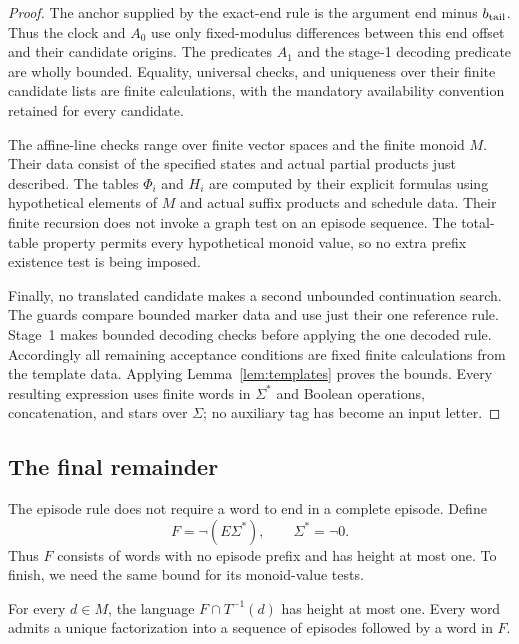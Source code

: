 \begin{proof}
The anchor supplied by the exact-end rule is the argument end minus
$b_{\rm tail}$.  Thus the clock and $A_0$ use only fixed-modulus
differences between this end offset and their candidate origins.
The predicates $A_1$ and the stage-1 decoding predicate are wholly
bounded.  Equality, universal checks, and uniqueness over their finite
candidate lists are finite calculations, with the mandatory availability
convention retained for every candidate.

The affine-line checks range over finite vector spaces and the finite
monoid $M$.  Their data consist of the specified states and actual
partial products just described.  The tables $\Phi_i$ and $H_i$ are
computed by their explicit formulas using hypothetical elements of $M$
and actual suffix products and schedule data.  Their finite recursion
does not invoke a graph test on an episode sequence.  The total-table
property permits every hypothetical monoid value, so no extra prefix
existence test is being imposed.

Finally, no translated candidate makes a second unbounded continuation
search.  The guards compare bounded marker data and use just their one
reference rule.  Stage~1 makes bounded decoding checks before applying
the one decoded rule.  Accordingly all remaining acceptance conditions
are fixed finite calculations from the template data.  Applying
Lemma~\ref{lem:templates} proves the bounds.  Every resulting expression
uses finite words in $\Sigma^*$ and Boolean operations, concatenation,
and stars over $\Sigma$; no auxiliary tag has become an input letter.
\end{proof}

\subsection{The final remainder}

The episode rule does not require a word to end in a complete episode.
Define
\[
 F=\neg(E\Sigma^*),\qquad \Sigma^*=\neg0.
\]
Thus $F$ consists of words with no episode prefix and has height at most
one.  To finish, we need the same bound for its monoid-value tests.

\begin{lemma}[Remainder]
\label{lem:remainder}
For every $d\in M$, the language $F\cap T^{-1}(d)$ has height at most
one.  Every word admits a unique factorization into a sequence of
episodes followed by a word in $F$.
\end{lemma}

